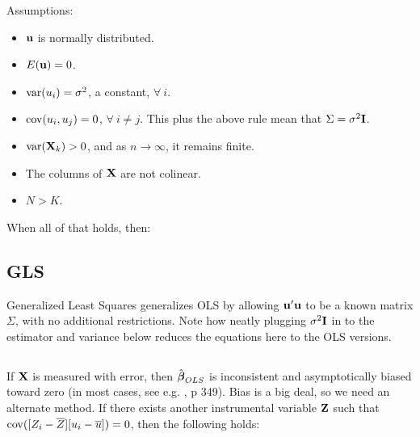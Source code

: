 Assumptions:

\begin{itemize}
\item ${\bf u}$ is normally distributed.
\item $E({\bf u}) = 0$.
\item $\operatorname{var}(u_i) = \sigma^2$, a constant, $\forall\ i$.
\item $\operatorname{cov}(u_i, u_j) = 0$, $\forall\ i\neq j$. This plus the above rule
mean that $\Sigma =
\sigma^2{\bf I}$.
\item $\operatorname{var}({\bf X}_k)>0$, and as $n\to\infty$, it remains finite.
\item The columns of ${\bf X}$ are not colinear.
\item $N>K$.
\end{itemize}

When all of that holds, then:

\subsection{GLS} \label{GLS}
Generalized Least Squares generalizes OLS by allowing ${\bf u}'{\bf u}$ to be a
known matrix $\Sigma$, with no additional restrictions.
Note how neatly plugging $\sigma^2{\bf I}$ in to the
estimator and variance below reduces the equations here to the OLS
versions.


\subsection{}			\label{IV}

If ${\bf X}$ is measured with error, then $\hat{{\mbox{\boldmath$\beta$}}}_{OLS}$ is inconsistent and
asymptotically biased toward zero (in most cases, see e.g. \cite{kmenta},
p 349). Bias is a big deal, so we need an alternate method. If there exists
another instrumental variable ${\bf Z}$ such that $\operatorname{cov}([Z_i-\overline
Z][u_i-\overline u])=0$, then the following holds:

